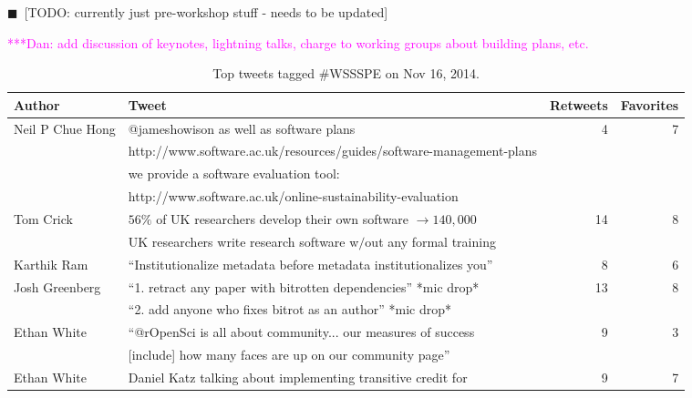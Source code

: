 \documentclass[11pt, oneside]{amsart}
\newcommand{\todo}[1]{{\color{blue}$\blacksquare$~\textsf{[TODO: #1]}}}
\newcommand{\katznote}[1]{ {\textcolor{magenta}    { ***Dan:      #1 }}}
\begin{document}
\todo{currently just pre-workshop stuff - needs to be updated}

\katznote{add discussion of keynotes, lightning talks, charge to working groups about building plans, etc.}


\begin{table*}[t]
\centering
\caption{Top tweets tagged \#WSSSPE on Nov 16, 2014.}\label{tab:tweets}
  \begin{scriptsize}
  \begin{tabular}{l|l|r|r}
 \hline
    Author  &   Tweet  & Retweets &  Favorites
\\ \hline 
%
%
 Neil P Chue Hong  &  @jameshowison as well as software plans   & 4 & 7
\\   &   http://www.software.ac.uk/resources/guides/software-management-plans &    & 
\\   &   we provide a software evaluation tool:   &    & 
\\   &   http://www.software.ac.uk/online-sustainability-evaluation  &    & 
%
\\ Tom Crick  & $56\%$ of UK researchers develop their own software $\rightarrow  140,000$   &  14 & 8
\\ & UK researchers write research software w$/$out any formal training &    & 
%
\\ Karthik Ram  &  ``Institutionalize metadata before metadata institutionalizes you'' & 8 & 6
%
\\ Josh Greenberg  &  ``1. retract any paper with bitrotten dependencies'' *mic drop* & 13 & 8
\\   &   ``2. add anyone who fixes bitrot as an author'' *mic drop*  &    & 
%
\\ Ethan White &  ``@rOpenSci is all about community... our measures of success  & 9 & 3
\\ &   [include] how many faces are up on our community page''   &    & 
%
\\ Ethan White & Daniel Katz talking about implementing transitive credit for  & 9 & 7

\end{tabular}
\end{scriptsize}
\end{table*}
\end{document}
